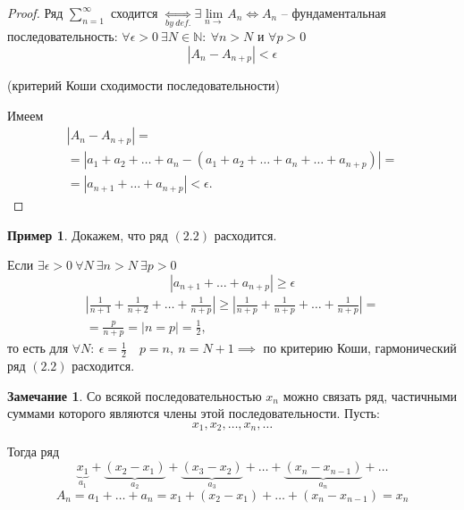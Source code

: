 \documentclass{report}
\theoremstyle{definition}
\newtheorem{example}{Пример}
\newtheorem*{remark}{Замечание}
\begin{document}
\begin{proof}
  Ряд $\sum_{n=1}^{\infty}$ сходится $\underset{by \ def.}{\iff} \exists \underset{n\rightarrow}{\lim}A_n \iff A_n$ -- фундаментальная последовательность: $\forall \epsilon > 0 \ \exists N \in \mathbb{N}: \ \forall n > N$ и $\forall p > 0$
  \begin{equation*}
    |A_n - A_{n+p}| < \epsilon
  \end{equation*}
  \begin{center}
    (критерий Коши сходимости последовательности)
  \end{center}
  Имеем
  \begin{multline*}
    |A_n - A_{n+p}| = \\
    =|a_1 + a_2 + \ldots + a_n - (a_1 + a_2 + \ldots + a_n + \ldots + a_{n+p})| = \\
    = |a_{n+1} + \ldots + a_{n+p}| < \epsilon.
  \end{multline*}
\end{proof}

\begin{example}
  Докажем, что ряд $(2.2)$ расходится.

  Если $\exists\epsilon > 0 \ \forall N \ \exists n > N \ \exists p > 0$
  \begin{equation*}
    |a_{n+1} + \ldots + a_{n+p}| \geqslant \epsilon
  \end{equation*}
  \begin{multline*}
    |\frac{1}{n+1} + \frac{1}{n+2} + \ldots + \frac{1}{n+p}| \geqslant |\frac{1}{n+p} + \frac{1}{n+p} + \ldots + \frac{1}{n+p}| = \\
    = \frac{p}{n+p} = \left| n = p \right| = \frac{1}{2},
  \end{multline*}
  то есть для $\forall N: \ \epsilon = \frac{1}{2} \quad p = n, \ n = N + 1 \implies$ по критерию Коши, гармонический ряд $(2.2)$ расходится.
\end{example}

\begin{remark}
  Со всякой последовательностью $x_n$ можно связать ряд, частичными суммами которого являются члены этой последовательности. Пусть:
  \begin{equation*}
    x_1,x_2,\ldots,x_n,\ldots
  \end{equation*}

  Тогда ряд
  \begin{equation*}
    \underbrace{x_1}_{a_1} + \underbrace{(x_2 - x_1)}_{a_2} + \underbrace{(x_3 - x_2)}_{a_3} + \ldots + \underbrace{(x_n - x_{n-1})}_{a_n} + \ldots
  \end{equation*}
  \begin{equation*}
    A_n = a_1 + \ldots + a_n = x_1 + (x_2 - x_1) + \ldots + (x_n - x_{n-1}) = x_n
  \end{equation*}
\end{remark}
\end{document}
